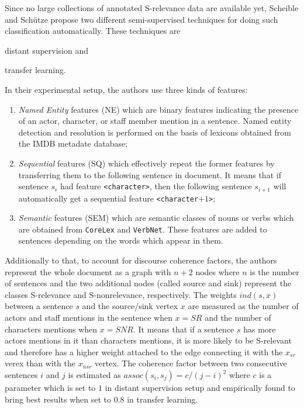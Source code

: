 \documentclass[a4paper,11pt]{article}
\begin{document}
Since no large collections of annotated S-relevance data are available
yet, Scheible and Sch\"utze propose two different semi-supervised
techniques for doing such classification automatically.  These
techniques are
\begin{inparaenum}
  \item distant supervision and
  \item transfer learning.
\end{inparaenum} In their experimental setup, the authors use three kinds of features:
\begin{enumerate}
  \item \textit{Named Entity} features (NE) which are binary features
    indicating the presence of an actor, character, or staff member
    mention in a sentence.  Named entity detection and resolution is
    performed on the basis of lexicons obtained from the IMDB metadate
    database;\label{li-ne-feat}
  \item \textit{Sequential} features (SQ) which effectively repeat the
    former features by transferring them to the following sentence in
    document.  It means that if sentence $s_i$ had feature
    \texttt{<character>}, then the following sentence $s_{i+1}$ will
    automatically get a sequential feature \texttt{<character$+1$>};
  \item \textit{Semantic} features (SEM) which are semantic classes of
    nouns or verbs which are obtained from \texttt{CoreLex} and
    \texttt{VerbNet}.  These features are added to sentences depending
    on the words which appear in them.
\end{enumerate}
Additionally to that, to account for discourse coherence factors, the
authors represent the whole document as a graph with $n + 2$ nodes
where $n$ is the number of sentences and the two additional nodes
(called source and sink) represent the classes S-relevance and
S-nonrelevance, respectively.  The weights $ind(s, x)$ between a
sentence $s$ and the source/sink vertex $x$ are measured as the number
of actors and staff mentions in the sentence when $x = SR$ and the
number of characters mentions when $x = SNR$.  It means that if a
sentence $s$ has more actors mentions in it than characters mentions,
it is more likely to be S-relevant and therefore has a higher weight
attached to the edge connecting it with the $x_{sr}$ verex than with
the $x_{nsr}$ vertex.  The coherence factor between two consecutive
sentences $i$ and $j$ is estimated as $assoc(s_i, s_j) = c / (j -
i)^2$ where $c$ is a parameter which is set to $1$ in distant
supervision setup and empirically found to bring best results when set
to $0.8$ in transfer learning.
\end{document}
